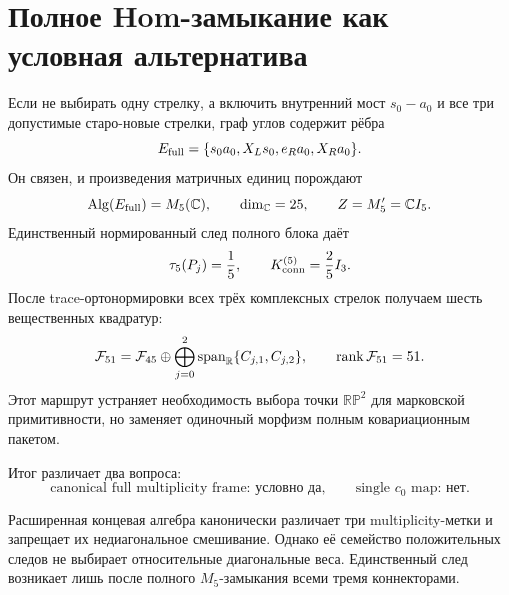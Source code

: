 \section{Полное Hom-замыкание как условная альтернатива}

Если не выбирать одну стрелку, а включить внутренний мост $s_0-a_0$ и все
три допустимые старо-новые стрелки, граф углов содержит рёбра
\begin{equation}
 E_{\rm full}=\{s_0a_0,X_Ls_0,e_Ra_0,X_Ra_0\}.
 \label{eq:v8-baryon-c0-full-local-edge-set}
\end{equation}
Он связен, и произведения матричных единиц порождают
\begin{equation}
 \operatorname{Alg}(E_{\rm full})=M_5(\mathbb C),
 \qquad \dim_{\mathbb C}=25,
 \qquad Z=M_5'=\mathbb C I_5.
 \label{eq:v8-baryon-c0-full-local-m5-closure}
\end{equation}
Единственный нормированный след полного блока даёт
\begin{equation}
 \tau_5(P_j)=\frac15,
 \qquad K_{\rm conn}^{(5)}=\frac25 I_3.
 \label{eq:v8-baryon-c0-m5-unique-trace-connector-metric}
\end{equation}
После trace-ортонормировки всех трёх комплексных стрелок получаем шесть
вещественных квадратур:
\begin{equation}
 \mathcal F_{51}=\mathcal F_{45}\oplus
 \bigoplus_{j=0}^{2}\operatorname{span}_{\mathbb R}
 \{C_{j,1},C_{j,2}\},
 \qquad \operatorname{rank}\mathcal F_{51}=51.
 \label{eq:v8-baryon-c0-full-multiplicity-frame-51}
\end{equation}
Этот маршрут устраняет необходимость выбора точки $\mathbb{RP}^2$ для
марковской примитивности, но заменяет одиночный морфизм полным
ковариационным пакетом.

Итог различает два вопроса:
\begin{equation}
 \text{canonical full multiplicity frame: условно да},
 \qquad
 \text{single }c_0\text{ map: нет}.
 \label{eq:v8-baryon-c0-full-frame-versus-single-map-ledger}
\end{equation}

\begin{theorem}
Расширенная концевая алгебра канонически различает три multiplicity-метки и
запрещает их недиагональное смешивание. Однако её семейство положительных
следов не выбирает относительные диагональные веса. Единственный след
возникает лишь после полного $M_5$-замыкания всеми тремя коннекторами.
\end{theorem}


